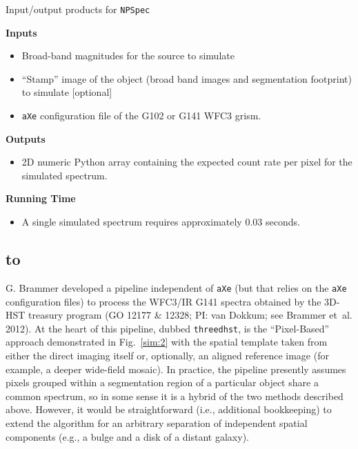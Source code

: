 \documentclass[12pt]{article}
\def\ssubsection#1{\subsection{\hbox to \hsize{#1\hfill}}}
\begin{document}
\centerline{Input/output products for \texttt{NPSpec}}
\noindent \textbf{Inputs}
\begin{itemize}
\item Broad-band magnitudes for the source to simulate
\item ``Stamp'' image of the object (broad band images and segmentation footprint) to simulate [optional]
\item \texttt{aXe} configuration file of the G102 or G141 WFC3 grism.
\end{itemize}
\noindent \textbf{Outputs}
\begin{itemize}
\item 2D numeric Python array containing the expected count rate per pixel for the simulated spectrum.
\end{itemize}
\noindent \textbf{Running Time}
\begin{itemize}
\item A single simulated spectrum requires approximately 0.03 seconds.
\end{itemize}

\ssubsection{``\texttt{threedhst}''}

G. Brammer developed a pipeline independent of \texttt{aXe} (but that relies on the \texttt{aXe} configuration files) to process the WFC3/IR G141 spectra obtained by the 3D-HST treasury program (GO 12177 \& 12328; PI: van Dokkum; see Brammer et~al. 2012).  At the heart of this pipeline, dubbed \texttt{threedhst}, is the ``Pixel-Based'' approach demonstrated in Fig.~\ref{sim:2} with the spatial template taken from either the direct imaging itself or, optionally, an aligned reference image (for example, a deeper wide-field mosaic).  In practice, the pipeline presently assumes pixels grouped within a segmentation region of a particular object share a common spectrum, so in some sense it is a hybrid of the two methods described above.  However, it would be straightforward (i.e., additional bookkeeping) to extend the algorithm for an arbitrary separation of independent spatial components (e.g., a bulge and a disk of a distant galaxy).
\end{document}
